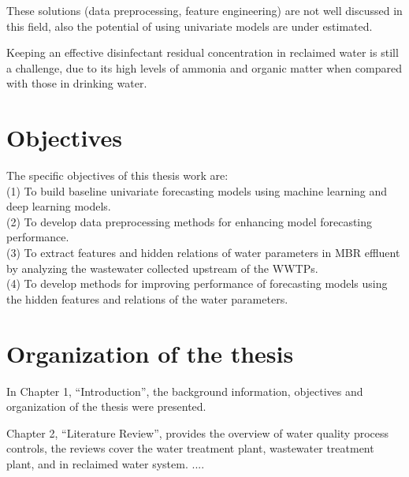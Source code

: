 These solutions (data preprocessing, feature engineering) are not well discussed in this field, also the 
potential of using univariate models are under estimated.

Keeping an effective disinfectant residual concentration in reclaimed water is still a challenge, due to its high levels of ammonia and organic matter when compared with those in drinking water. \citep{costaIdentificationModellingChlorine2021}



\section{Objectives}
\noindent
The specific objectives of this thesis work are:\\
(1) To build baseline univariate forecasting models using machine learning and deep learning models.\\
(2) To develop data preprocessing methods for enhancing model forecasting performance.\\
(3) To extract features and hidden relations of water parameters in MBR effluent by analyzing the wastewater collected upstream of the WWTPs.\\
(4) To develop methods for improving performance of forecasting models using the hidden features and relations of the water parameters.

\section{Organization of the thesis}
In Chapter 1, “Introduction”, the background information, objectives and organization of the thesis were presented.

Chapter 2, “Literature Review”, provides the overview of water quality process controls, the reviews cover the water treatment plant, wastewater treatment plant, and in reclaimed water system.
....

